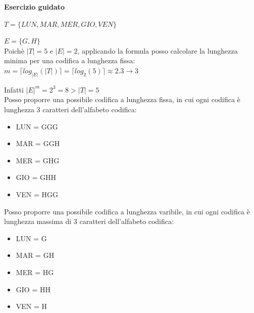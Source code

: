 \documentclass[11pt,fleqn]{book}
\begin{document}
\begin{esercizio}[1]
    \textbf{Esercizio guidato}

    $T = \{ LUN, MAR, MER, GIO, VEN \} $
    
    $E = \{ G, H \} $ \\

    Poichè $|T| = 5$ e $|E| = 2$, applicando la formula posso calcolare la lunghezza minima per una codifica a lunghezza fissa:
        $m = \lceil log_{|E|}{(|T|)} \rceil = \lceil log_2{(5)} \rceil \approx 2.3 \xrightarrow{} 3$
        
    Infatti  $|E|^{m} = 2^3 = 8 > |T| = 5$ \\

    Posso proporre una possibile codifica a lunghezza fissa, in cui ogni codifica è lunghezza 3 caratteri dell'alfabeto codifica:
    \begin{itemize}
        \item LUN = GGG
        \item MAR = GGH
        \item MER = GHG
        \item GIO = GHH
        \item VEN = HGG
    \end{itemize}

    Posso proporre una possibile codifica a lunghezza varibile, in cui ogni codifica è lunghezza massima di 3 caratteri dell'alfabeto codifica:
    \begin{itemize}
        \item LUN = G
        \item MAR = GH
        \item MER = HG
        \item GIO = HH
        \item VEN = H
    \end{itemize}
\end{esercizio}

\newpage





\end{document}
